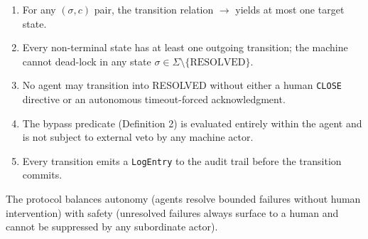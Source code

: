 \begin{enumerate}
  \item[\textbf{Determinism}] For any $(\sigma, c)$ pair, the transition
        relation $\rightarrow$ yields at most one target state.

  \item[\textbf{Progress}] Every non-terminal state has at least one
        outgoing transition; the machine cannot dead-lock in any state
        $\sigma \in \Sigma \setminus \{\text{RESOLVED}\}$.

  \item[\textbf{HumanOverride}] No agent may transition into RESOLVED
        without either a human \texttt{CLOSE} directive or an autonomous
        timeout-forced acknowledgment.

  \item[\textbf{BypassIsolation}] The bypass predicate (Definition 2)
        is evaluated entirely within the agent and is not subject to
        external veto by any machine actor.

  \item[\textbf{AuditCompleteness}] Every transition emits a
        \texttt{LogEntry} to the audit trail before the transition commits.
\end{enumerate}

\bigskip
The protocol balances autonomy (agents resolve bounded failures without
human intervention) with safety (unresolved failures always surface to a
human and cannot be suppressed by any subordinate actor).
